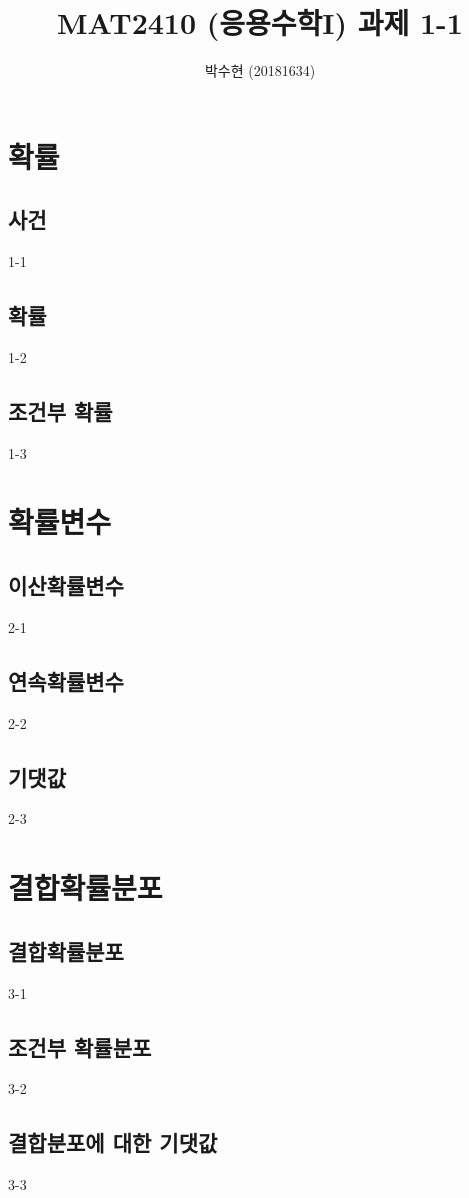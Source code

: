 



\title{MAT2410 (응용수학I) \newline 과제 1-1}
\author{박수현 (20181634)}
\maketitle

\setcounter{section}{0}

\section{확률}
\setcounter{subsection}{0}

\subsection{사건}
{1-1}

\newpage
\subsection{확률}
{1-2}

\newpage
\subsection{조건부 확률}
{1-3}

\newpage
\section{확률변수}
\setcounter{subsection}{0}

\subsection{이산확률변수}
{2-1}

\newpage
\subsection{연속확률변수}
{2-2}

\newpage
\subsection{기댓값}
{2-3}

\newpage
\section{결합확률분포}
\setcounter{subsection}{0}

\subsection{결합확률분포}
{3-1}

\newpage
\subsection{조건부 확률분포}
{3-2}

\newpage
\subsection{결합분포에 대한 기댓값}
{3-3}


